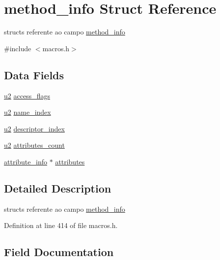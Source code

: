 \hypertarget{structmethod__info}{}\section{method\+\_\+info Struct Reference}
\label{structmethod__info}


structs referente ao campo \hyperlink{structmethod__info}{method\+\_\+info}  




{\ttfamily \#include $<$macros.\+h$>$}

\subsection*{Data Fields}
\begin{DoxyCompactItemize}
\item 
\hyperlink{macros_8h_aa76d8c8015643c6a837661a10142016e}{u2} \hyperlink{structmethod__info_a4cc32d48303aeaaaaea05bf77abdec59}{access\+\_\+flags}
\item 
\hyperlink{macros_8h_aa76d8c8015643c6a837661a10142016e}{u2} \hyperlink{structmethod__info_ae939ac3ca00f5727beaa02d0e339183d}{name\+\_\+index}
\item 
\hyperlink{macros_8h_aa76d8c8015643c6a837661a10142016e}{u2} \hyperlink{structmethod__info_a3f13794b6c8b4ffc87b87a7c01a69060}{descriptor\+\_\+index}
\item 
\hyperlink{macros_8h_aa76d8c8015643c6a837661a10142016e}{u2} \hyperlink{structmethod__info_aa53122439ee827a418258d52c51368c6}{attributes\+\_\+count}
\item 
\hyperlink{structattribute__info}{attribute\+\_\+info} $\ast$ \hyperlink{structmethod__info_aae221e548ab4ef529cd1a0f2fcdabb9b}{attributes}
\end{DoxyCompactItemize}


\subsection{Detailed Description}
structs referente ao campo \hyperlink{structmethod__info}{method\+\_\+info} 

Definition at line 414 of file macros.\+h.



\subsection{Field Documentation}
\hypertarget{structmethod__info_a4cc32d48303aeaaaaea05bf77abdec59}{}
